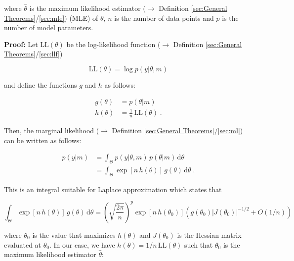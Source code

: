 \documentclass[a4paper,12pt,twoside]{book}
\begin{document}
where $\hat{\theta}$ is the maximum likelihood estimator ($\rightarrow$ Definition \ref{sec:General Theorems}/\ref{sec:mle}) (MLE) of $\theta$, $n$ is the number of data points and $p$ is the number of model parameters.


\vspace{1em}
\textbf{Proof:} Let $\mathrm{LL}(\theta)$ be the log-likelihood function ($\rightarrow$ Definition \ref{sec:General Theorems}/\ref{sec:llf})

\begin{equation} \label{eq:bic-der-LL}
\mathrm{LL}(\theta) = \log p(y|\theta,m)
\end{equation}

and define the functions $g$ and $h$ as follows:

\begin{equation} \label{eq:bic-der-gh}
\begin{split}
g(\theta) &= p(\theta|m) \\
h(\theta) &= \frac{1}{n} \, \mathrm{LL}(\theta) \; .
\end{split}
\end{equation}

Then, the marginal likelihood ($\rightarrow$ Definition \ref{sec:General Theorems}/\ref{sec:ml}) can be written as follows:

\begin{equation} \label{eq:bic-der-ML}
\begin{split}
p(y|m) &= \int_{\Theta} p(y|\theta,m) \, p(\theta|m) \, \mathrm{d}\theta \\
&= \int_{\Theta} \exp\left[n \, h(\theta)\right] \, g(\theta) \, \mathrm{d}\theta \; .
\end{split}
\end{equation}

This is an integral suitable for Laplace approximation which states that

\begin{equation} \label{eq:bic-der-LA}
\int_{\Theta} \exp\left[n \, h(\theta)\right] \, g(\theta) \, \mathrm{d}\theta = \left( \sqrt{\frac{2 \pi}{n}} \right)^p \exp\left[n \, h(\theta_0)\right] \left( g(\theta_0) \left| J(\theta_0) \right|^{-1/2} + O(1/n) \right)
\end{equation}

where $\theta_0$ is the value that maximizes $h(\theta)$ and $J(\theta_0)$ is the Hessian matrix evaluated at $\theta_0$. In our case, we have $h(\theta) = 1/n \, \mathrm{LL}(\theta)$ such that $\theta_0$ is the maximum likelihood estimator $\hat{\theta}$:
\end{document}
